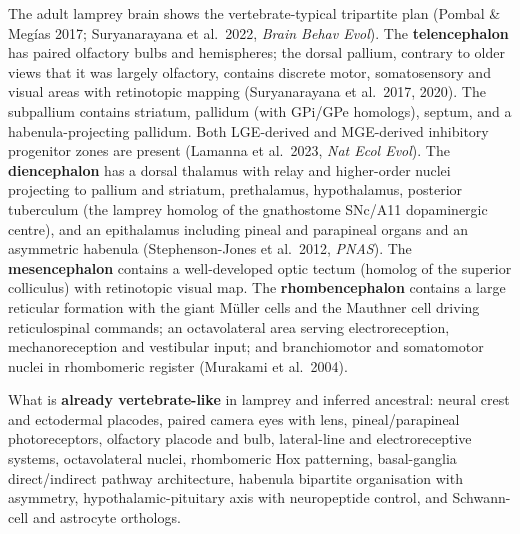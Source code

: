 The adult lamprey brain shows the vertebrate-typical tripartite plan (Pombal \& Megías 2017; Suryanarayana et al.~2022, \emph{Brain Behav Evol}). The \textbf{telencephalon} has paired olfactory bulbs and hemispheres; the dorsal pallium, contrary to older views that it was largely olfactory, contains discrete motor, somatosensory and visual areas with retinotopic mapping (Suryanarayana et al.~2017, 2020). The subpallium contains striatum, pallidum (with GPi/GPe homologs), septum, and a habenula-projecting pallidum. Both LGE-derived and MGE-derived inhibitory progenitor zones are present (Lamanna et al.~2023, \emph{Nat Ecol Evol}). The \textbf{diencephalon} has a dorsal thalamus with relay and higher-order nuclei projecting to pallium and striatum, prethalamus, hypothalamus, posterior tuberculum (the lamprey homolog of the gnathostome SNc/A11 dopaminergic centre), and an epithalamus including pineal and parapineal organs and an asymmetric habenula (Stephenson-Jones et al.~2012, \emph{PNAS}). The \textbf{mesencephalon} contains a well-developed optic tectum (homolog of the superior colliculus) with retinotopic visual map. The \textbf{rhombencephalon} contains a large reticular formation with the giant Müller cells and the Mauthner cell driving reticulospinal commands; an octavolateral area serving electroreception, mechanoreception and vestibular input; and branchiomotor and somatomotor nuclei in rhombomeric register (Murakami et al.~2004).

What is \textbf{already vertebrate-like} in lamprey and inferred ancestral: neural crest and ectodermal placodes, paired camera eyes with lens, pineal/parapineal photoreceptors, olfactory placode and bulb, lateral-line and electroreceptive systems, octavolateral nuclei, rhombomeric Hox patterning, basal-ganglia direct/indirect pathway architecture, habenula bipartite organisation with asymmetry, hypothalamic-pituitary axis with neuropeptide control, and Schwann-cell and astrocyte orthologs.


